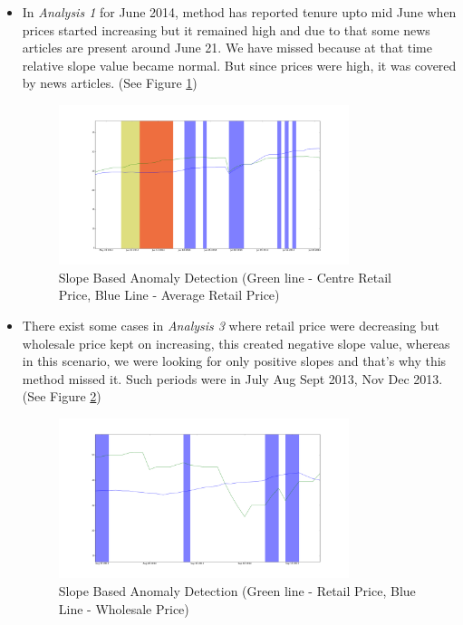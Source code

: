 \documentclass[a4paper,10pt]{report}
\begin{document}
\begin{itemize}
			\item In \textit{Analysis 1} for June 2014, method has reported tenure upto mid June when prices started increasing but it remained high and due to that some news articles are present around June 21. We have missed because at that time relative slope value became normal. But since prices were high, it was covered by news articles. (See Figure \ref{fig:12116})
			
			\begin{figure}[H]
		    	\centering
  		    	\includegraphics[width=0.8\textwidth]{graphs/12116.png}
		    	\caption{Slope Based Anomaly Detection (Green line - Centre Retail Price, Blue Line - Average Retail Price)}
		    	\label{fig:12116}
			\end{figure}			
			
			
			\item There exist some cases in \textit{Analysis 3} where retail price were decreasing but wholesale price kept on increasing, this created negative slope value, whereas in this scenario, we were looking for only positive slopes and that's why this method missed it. Such periods were in July Aug Sept 2013, Nov Dec 2013. (See Figure \ref{fig:12134})
			
			\begin{figure}[H]
		    	\centering
  		    	\includegraphics[width=0.8\textwidth]{graphs/12134.png}
		    	\caption{Slope Based Anomaly Detection (Green line - Retail Price, Blue Line - Wholesale Price)}
		    	\label{fig:12134}
			\end{figure}			
			
		\end{itemize}
		
\end{document}
